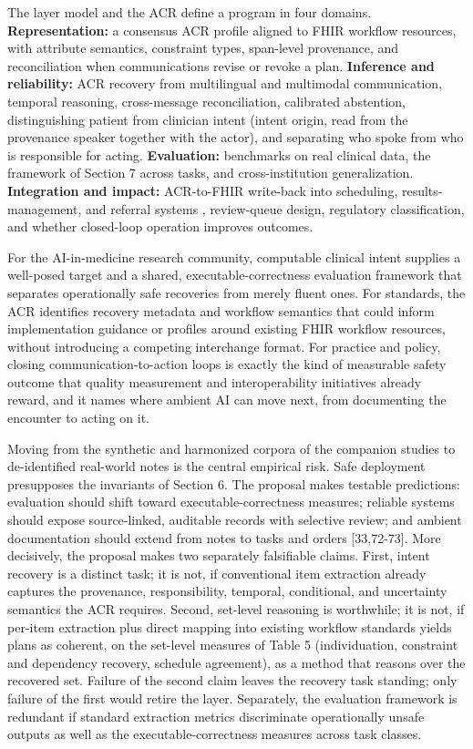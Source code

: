 \documentclass[3p,twocolumn]{elsarticle}
\begin{document}
The layer model and the ACR define a program in four domains. \textbf{Representation:} a consensus ACR profile aligned to FHIR workflow resources, with attribute semantics, constraint types, span-level provenance, and reconciliation when communications revise or revoke a plan. \textbf{Inference and reliability:} ACR recovery from multilingual and multimodal communication, temporal reasoning, cross-message reconciliation, calibrated abstention, distinguishing patient from clinician intent (intent origin, read from the provenance speaker together with the actor), and separating who spoke from who is responsible for acting. \textbf{Evaluation:} benchmarks on real clinical data, the framework of Section 7 across tasks, and cross-institution generalization. \textbf{Integration and impact:} ACR-to-FHIR write-back into scheduling, results-management, and referral systems \cite{ref23}, review-queue design, regulatory classification, and whether closed-loop operation improves outcomes.

For the AI-in-medicine research community, computable clinical intent supplies a well-posed target and a shared, executable-correctness evaluation framework that separates operationally safe recoveries from merely fluent ones. For standards, the ACR identifies recovery metadata and workflow semantics that could inform implementation guidance or profiles around existing FHIR workflow resources, without introducing a competing interchange format. For practice and policy, closing communication-to-action loops is exactly the kind of measurable safety outcome that quality measurement and interoperability initiatives already reward, and it names where ambient AI can move next, from documenting the encounter to acting on it.

Moving from the synthetic and harmonized corpora of the companion studies to de-identified real-world notes is the central empirical risk. Safe deployment presupposes the invariants of Section 6. The proposal makes testable predictions: evaluation should shift toward executable-correctness measures; reliable systems should expose source-linked, auditable records with selective review; and ambient documentation should extend from notes to tasks and orders {[}33,72-73{]}. More decisively, the proposal makes two separately falsifiable claims. First, intent recovery is a distinct task; it is not, if conventional item extraction already captures the provenance, responsibility, temporal, conditional, and uncertainty semantics the ACR requires. Second, set-level reasoning is worthwhile; it is not, if per-item extraction plus direct mapping into existing workflow standards yields plans as coherent, on the set-level measures of Table 5 (individuation, constraint and dependency recovery, schedule agreement), as a method that reasons over the recovered set. Failure of the second claim leaves the recovery task standing; only failure of the first would retire the layer. Separately, the evaluation framework is redundant if standard extraction metrics discriminate operationally unsafe outputs as well as the executable-correctness measures across task classes.
\end{document}
